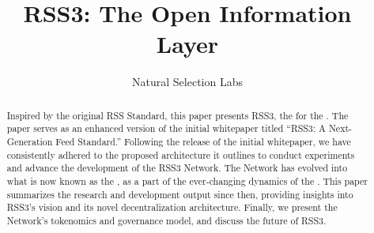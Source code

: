 \documentclass[conference]{IEEEtran}
\begin{document}
\title{RSS3: The Open Information Layer}

\author{Natural Selection Labs}
\maketitle

\setcounter{tocdepth}{4}
\tableofcontents

\thispagestyle{plain}
\pagestyle{plain}

\begin{abstract}

    Inspired by the original RSS Standard, this paper presents RSS3, the  for the . The paper serves as an enhanced version of the initial whitepaper titled ``RSS3: A Next-Generation Feed Standard.'' Following the release of the initial whitepaper, we have consistently adhered to the proposed architecture it outlines to conduct experiments and advance the development of the RSS3 Network. The Network has evolved into what is now known as the , as a part of the ever-changing dynamics of the . This paper summarizes the research and development output since then, providing insights into RSS3's vision and its novel decentralization architecture. Finally, we present the Network's tokenomics and governance model, and discuss the future of RSS3.

\end{abstract}













% 
% 

\cleardoublepage

\printglossary[title=Glossary, toctitle=Glossary]
\end{document}
